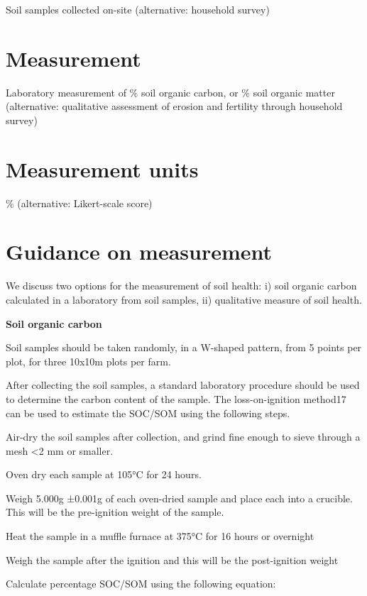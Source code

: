 \documentclass[
  letterpaper,
  DIV=11,
  numbers=noendperiod]{scrreprt}
\begin{document}
Soil samples collected on-site (alternative: household survey)

\section{Measurement}\label{measurement-2}

Laboratory measurement of \% soil organic carbon, or \% soil organic
matter (alternative: qualitative assessment of erosion and fertility
through household survey)

\section{Measurement units}\label{measurement-units-2}

\% (alternative: Likert-scale score)

\section{Guidance on measurement}\label{guidance-on-measurement-2}

We discuss two options for the measurement of soil health: i) soil
organic carbon calculated in a laboratory from soil samples, ii)
qualitative measure of soil health.

\textbf{Soil organic carbon}

Soil samples should be taken randomly, in a W-shaped pattern, from 5
points per plot, for three 10x10m plots per farm.

After collecting the soil samples, a standard laboratory procedure
should be used to determine the carbon content of the sample. The
loss-on-ignition method17 can be used to estimate the SOC/SOM using the
following steps.

Air-dry the soil samples after collection, and grind fine enough to
sieve through a mesh \textless2 mm or smaller.

Oven dry each sample at 105°C for 24 hours.

Weigh 5.000g ±0.001g of each oven-dried sample and place each into a
crucible. This will be the pre-ignition weight of the sample.

Heat the sample in a muffle furnace at 375°C for 16 hours or overnight

Weigh the sample after the ignition and this will be the post-ignition
weight

Calculate percentage SOC/SOM using the following equation:
\end{document}
